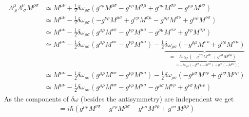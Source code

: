 \documentclass[10pt,a4paper]{book}
\theoremstyle{definition}
\begin{document}
\begin{align}
\Lambda^{\mu}_{\;\rho}\Lambda^\nu_{\;\sigma}M^{\rho\sigma}
&\simeq M^{\mu\nu}+\frac{1}{2}\delta\omega_{\rho\sigma}\left(g^{\nu\rho}M^{\mu\sigma}-g^{\nu\rho}M^{\sigma\mu}+g^{\rho\mu}M^{\sigma\nu}-g^{\mu\rho}M^{\nu\sigma}\right)\\
&\simeq M^{\mu\nu}-\frac{1}{2}\delta\omega_{\rho\sigma}\left(-g^{\nu\rho}M^{\mu\sigma}+g^{\nu\rho}M^{\sigma\mu}-g^{\rho\mu}M^{\sigma\nu}+g^{\mu\rho}M^{\nu\sigma}\right)\\
&\simeq M^{\mu\nu}-\frac{1}{2}\delta\omega_{\rho\sigma}\left(g^{\mu\rho}M^{\nu\sigma}-g^{\nu\rho}M^{\mu\sigma}-g^{\rho\mu}M^{\sigma\nu}+g^{\nu\rho}M^{\sigma\mu}\right)\\
&\simeq M^{\mu\nu}-\frac{1}{2}\delta\omega_{\rho\sigma}\left(g^{\mu\rho}M^{\nu\sigma}-g^{\nu\rho}M^{\mu\sigma}\right)-\frac{1}{2}\underbrace{\delta\omega_{\rho\sigma}\left(-g^{\rho\mu}M^{\sigma\nu}+g^{\nu\rho}M^{\sigma\mu}\right)}_{=\underbrace{\delta\omega_{\sigma\rho}\left(-g^{\sigma\mu}M^{\rho\nu}+g^{\nu\sigma}M^{\rho\mu}\right)}_{=-\delta\omega_{\rho\sigma}\left(-g^{\mu\sigma}(-M^{\nu\rho})+g^{\nu\sigma}(-M^{\mu\rho})\right)}}\\
&\simeq M^{\mu\nu}-\frac{1}{2}\delta\omega_{\rho\sigma}\left(g^{\mu\rho}M^{\nu\sigma}-g^{\nu\rho}M^{\mu\sigma}\right)-\frac{1}{2}\delta\omega_{\rho\sigma}\left(-g^{\mu\sigma}M^{\nu\rho}+g^{\nu\sigma}M^{\mu\rho}\right)\\
&\simeq M^{\mu\nu}-\frac{1}{2}\delta\omega_{\rho\sigma}\left(g^{\mu\rho}M^{\nu\sigma}-g^{\nu\rho}M^{\mu\sigma}-g^{\mu\sigma}M^{\nu\rho}+g^{\nu\sigma}M^{\mu\rho}\right)
\end{align}
As the components of $\delta\omega$ (besides the antisymmetry) are independent we get
\begin{align}
[M^{\mu\nu},M^{\rho\sigma}]=i\hbar\left(g^{\mu\rho}M^{\nu\sigma}-g^{\nu\rho}M^{\mu\sigma}-g^{\mu\sigma}M^{\nu\rho}+g^{\nu\sigma}M^{\mu\rho}\right)
\end{align}
\end{document}
